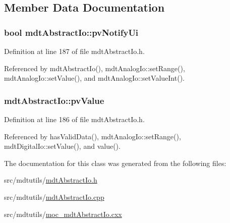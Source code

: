 \subsection{Member Data Documentation}
\hypertarget{classmdt_abstract_io_aa2dc002fc045276fac33f44fb20f6974}{
\subsubsection[{pv\-Notify\-Ui}]{\setlength{\rightskip}{0pt plus 5cm}bool mdt\-Abstract\-Io\-::pv\-Notify\-Ui\hspace{0.3cm}{\ttfamily [protected]}}}\label{classmdt_abstract_io_aa2dc002fc045276fac33f44fb20f6974}


Definition at line 187 of file mdt\-Abstract\-Io.\-h.



Referenced by mdt\-Abstract\-Io(), mdt\-Analog\-Io\-::set\-Range(), mdt\-Analog\-Io\-::set\-Value(), and mdt\-Analog\-Io\-::set\-Value\-Int().

\hypertarget{classmdt_abstract_io_ab955fdb5b2f6491917670a84752b823f}{
\subsubsection[{pv\-Value}]{ mdt\-Abstract\-Io\-::pv\-Value\hspace{0.3cm}{\ttfamily [protected]}}}\label{classmdt_abstract_io_ab955fdb5b2f6491917670a84752b823f}


Definition at line 186 of file mdt\-Abstract\-Io.\-h.



Referenced by has\-Valid\-Data(), mdt\-Analog\-Io\-::set\-Range(), mdt\-Digital\-Io\-::set\-Value(), and value().



The documentation for this class was generated from the following files\-:\begin{DoxyCompactItemize}
\item 
src/mdtutils/\hyperlink{mdt_abstract_io_8h}{mdt\-Abstract\-Io.\-h}\item 
src/mdtutils/\hyperlink{mdt_abstract_io_8cpp}{mdt\-Abstract\-Io.\-cpp}\item 
src/mdtutils/\hyperlink{moc__mdt_abstract_io_8cxx}{moc\-\_\-mdt\-Abstract\-Io.\-cxx}\end{DoxyCompactItemize}
